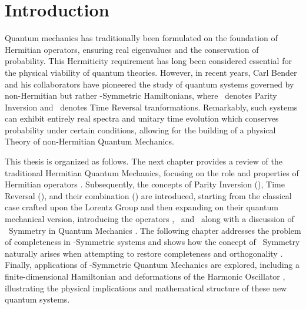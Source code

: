 \chapter{Introduction}\label{ch:introduction}
    Quantum mechanics has traditionally been formulated on the foundation of Hermitian operators, ensuring real eigenvalues and the conservation of probability. This Hermiticity requirement has long been considered essential for the physical viability of quantum theories. However, in recent years, Carl Bender and his collaborators have pioneered the study of quantum systems governed by non-Hermitian but rather \PT-Symmetric Hamiltonians, where \mcP\ denotes Parity Inversion and \mcT\ denotes Time Reversal tranformations. Remarkably, such systems can exhibit entirely real spectra and unitary time evolution which conserves probability under certain conditions, allowing for the building of a physical Theory of non-Hermitian Quantum Mechanics.

    This thesis is organized as follows. The next chapter provides a review of the traditional Hermitian Quantum Mechanics, focusing on the role and properties of Hermitian operators \cite{Shankar2012-kg,Sakurai2020-pu,Bernardini1993-iy}. Subsequently, the concepts of Parity Inversion (\mcP), Time Reversal (\mcT), and their combination (\PT) are introduced, starting from the classical case crafted upon the Lorentz Group \cite{bender2024} and then expanding on their quantum mechanical version, introducing the operators \hP, \hT\ and \hPT\ along with a discussion of \PT\ Symmetry in Quantum Mechanics \cite{Bender2005,bender2024}. The following chapter addresses the problem of completeness in \PT-Symmetric systems and shows how the concept of \CPT\ Symmetry naturally arises when attempting to restore completeness and orthogonality \cite{Bender2007,bender2024}. Finally, applications of \PT-Symmetric Quantum Mechanics are explored, including a finite-dimensional Hamiltonian and deformations of the Harmonic Oscillator \cite{Bender1998}, illustrating the physical implications and mathematical structure of these new quantum systems.